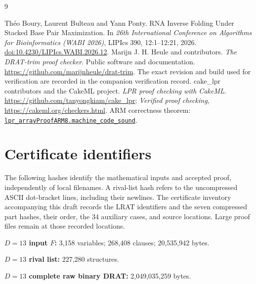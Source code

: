 \documentclass[11pt,a4paper]{article}
\theoremstyle{definition}
\begin{document}
\begin{thebibliography}{9}
\raggedright
{}
Th\'eo Boury, Laurent Bulteau and Yann Ponty.
RNA Inverse Folding Under Stacked Base Pair Maximization.
In \emph{26th International Conference on Algorithms for Bioinformatics
(WABI 2026)}, LIPIcs 390, 12:1--12:21, 2026.
\href{https://doi.org/10.4230/LIPIcs.WABI.2026.12}{doi:10.4230/LIPIcs.WABI.2026.12}.
Marijn J. H. Heule and contributors.
\emph{The DRAT-trim proof checker}. Public software and documentation.
\url{https://github.com/marijnheule/drat-trim}.
The exact revision and build used for verification are recorded in the
companion verification record.
cake\_lpr contributors and the CakeML project.
\emph{LPR proof checking with CakeML}.
\url{https://github.com/tanyongkiam/cake_lpr};
\emph{Verified proof checking}, \url{https://cakeml.org/checkers.html}.
ARM correctness theorem:
\href{https://github.com/CakeML/cakeml/blob/fb377b4bb704497c921cde68ccc8da3b4f0e9132/examples/lpr_checker/array/compilation/proofsARM8/lpr_arrayProofARM8Script.sml}{\texttt{lpr\_arrayProofARM8.machine\_code\_sound}}.
\end{thebibliography}

\appendix
\section{Certificate identifiers}\label{app:cert}
The following hashes identify the mathematical inputs and accepted
proof, independently of local filenames. A rival-list hash refers to
the uncompressed ASCII dot-bracket lines, including their newlines.
The certificate inventory accompanying this draft records the LRAT
identifiers and the seven
compressed part hashes, their order, the 34 auxiliary cases, and source
locations. Large proof files remain at those recorded locations.

\begingroup\small
\noindent\textbf{$D=13$ input $F$:} 3,158 variables; 268,408 clauses;
20,535,942 bytes.\\

\medskip\noindent\textbf{$D=13$ rival list:} 227,280 structures.\\

\medskip\noindent\textbf{$D=13$ complete raw binary DRAT:}
2,049,035,259 bytes.\\
\end{document}
